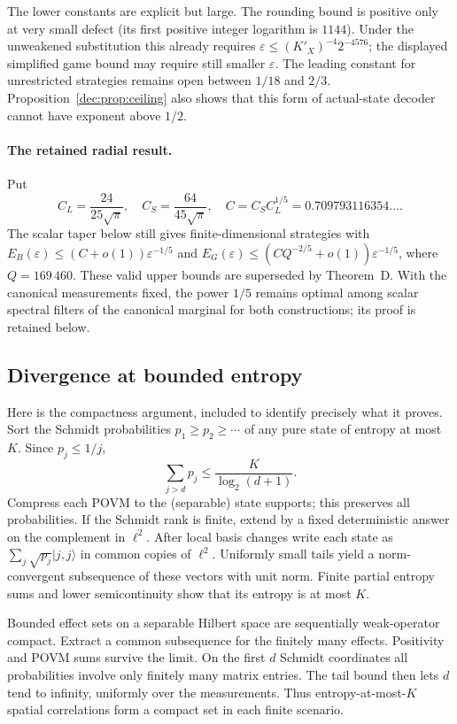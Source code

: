 The lower constants are explicit but large. The rounding bound is positive only at very small defect (its first positive integer logarithm is $1144$). Under the unweakened substitution this already requires $\varepsilon\le(K'_X)^{-4}2^{-4576}$; the displayed simplified game bound may require still smaller $\varepsilon$. The leading constant for unrestricted strategies remains open between $1/18$ and $2/3$. Proposition~\ref{dec:prop:ceiling} also shows that this form of actual-state decoder cannot have exponent above $1/2$.

\paragraph{The retained radial result.}
Put
\[
 C_L=\frac{24}{25\sqrt\pi},\quad C_S=\frac{64}{45\sqrt\pi},\quad
 C=C_SC_L^{1/5}=0.709793116354\ldots.
\]
The scalar taper below still gives finite-dimensional strategies with
$E_B(\varepsilon)\le(C+o(1))\varepsilon^{-1/5}$ and
$E_G(\varepsilon)\le(CQ^{-2/5}+o(1))\varepsilon^{-1/5}$, where $Q=169\,460$.
These valid upper bounds are superseded by Theorem~D. With the canonical measurements fixed, the power $1/5$ remains optimal among scalar spectral filters of the canonical marginal for both constructions; its proof is retained below.

\subsection{Divergence at bounded entropy}
Here is the compactness argument, included to identify precisely what it proves. Sort the Schmidt probabilities $p_1\geq p_2\geq\cdots$ of any pure state of entropy at most $K$. Since $p_j\leq1/j$,
\begin{equation}\label{eq:tail}
 \sum_{j>d}p_j\leq\frac{K}{\log_2(d+1)}.
\end{equation}
Compress each POVM to the (separable) state supports; this preserves all probabilities. If the Schmidt rank is finite, extend by a fixed deterministic answer on the complement in $\ell^2$. After local basis changes write each state as $\sum_j\sqrt{p_j}|j,j\rangle$ in common copies of $\ell^2$. Uniformly small tails yield a norm-convergent subsequence of these vectors with unit norm. Finite partial entropy sums and lower semicontinuity show that its entropy is at most $K$.

Bounded effect sets on a separable Hilbert space are sequentially weak-operator compact. Extract a common subsequence for the finitely many effects. Positivity and POVM sums survive the limit. On the first $d$ Schmidt coordinates all probabilities involve only finitely many matrix entries. The tail bound then lets $d$ tend to infinity, uniformly over the measurements. Thus entropy-at-most-$K$ spatial correlations form a compact set in each finite scenario.

